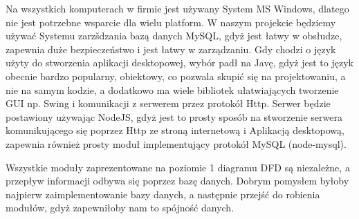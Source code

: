Na wszystkich komputerach w firmie jest używany System MS Windows, dlatego nie jest potrzebne wsparcie dla wielu platform.
W naszym projekcie będziemy używać Systemu zarzšdzania bazą danych MySQL, gdyż jest łatwy w obsłudze, zapewnia duże bezpieczeństwo i jest łatwy w zarządzaniu.
Gdy chodzi o język użyty do stworzenia aplikacji desktopowej, wybór padł na Javę, gdyż jest to język obecnie bardzo popularny,
obiektowy, co pozwala skupić się na projektowaniu, a nie na samym kodzie, a dodatkowo ma wiele bibliotek ułatwiających tworzenie GUI np. Swing i komunikacji z serwerem przez protokół Http.
Serwer będzie postawiony używając NodeJS, gdyż jest to prosty sposób na stworzenie serwera komunikującego się poprzez Http ze stroną internetową i Aplikacją desktopową, zapewnia również prosty moduł implementujący protokół MySQL (node-mysql).

Wszystkie moduły zaprezentowane na poziomie 1 diagramu DFD są niezależne, a przepływ informacji odbywa się poprzez bazę danych.
Dobrym pomysłem byłoby najpierw zaimplementowanie bazy danych, a następnie przejść do robienia modułów, gdyż zapewniłoby nam to spójność danych.